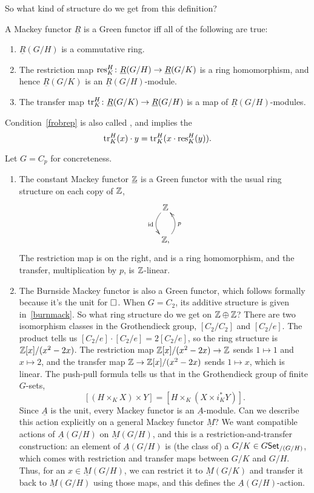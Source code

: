 So what kind of structure do we get from this definition?
\begin{prop}
A Mackey functor $\underline R$ is a Green functor iff all of the following are true:
\begin{enumerate}
	\item $\underline R(G/H)$ is a commutative ring.
	\item The restriction map $\operatorname{res}_K^H\colon \underline R(G/H)\to \underline R(G/K)$ is a ring homomorphism, and
	hence $\underline R(G/K)$ is an $\underline R(G/H)$-module.
	\item\label{frobrep} The transfer map $\operatorname{tr}_K^H\colon \underline R(G/K)\to \underline R(G/H)$ is a map of
	$\underline R(G/H)$-modules.
\end{enumerate}
\end{prop}
Condition~\eqref{frobrep} is also called , and implies the 
\[\operatorname{tr}_K^H(x)\cdot y = \operatorname{tr}_K^H(x\cdot\operatorname{res}_K^H(y)).\]
\begin{exm}
Let $G = C_p$ for concreteness.
\begin{enumerate}
	\item The constant Mackey functor $\underline{\mathbb Z}$ is a Green functor with the usual ring structure on each copy
	of $\mathbb Z$,
	\[\xymatrix{
		\Z\ar@/_0.4cm/[d]_\id\\
		\Z,\ar@/_0.4cm/[u]_p
	}\]
	The restriction map is on the right, and is a ring homomorphism, and the transfer, multiplication by $p$, is
	$\mathbb Z$-linear.
	\item The Burnside Mackey functor is also a Green functor, which follows formally because it's the unit for
	$\mathbin\square$. When $G = C_2$, its additive structure is given in~\eqref{burnmack}. So what ring structure do we
	get on $\mathbb Z\oplus\mathbb Z$? There are two isomorphism classes in the Grothendieck group, $[C_2/C_2]$ and $[C_2/e]$.
	The product tells us $[C_2/e]\cdot [C_2/e] = 2[C_2/e]$, so the ring structure is $\mathbb Z[x]/(x^2-2x)$. The
	restriction map $\mathbb Z[x]/(x^2-2x)\to\mathbb Z$ sends $1\mapsto 1$ and $x\mapsto 2$, and the transfer map
	$\mathbb Z\to\mathbb Z[x]/(x^2-2x)$ sends $1\mapsto x$, which is linear. The push-pull formula tells us that in the
	Grothendieck group of finite $G$-sets,
	\[[(H\times_K X)\times Y] = [H\times_K (X\times i_K^*Y)].\]
	Since $\underline A$ is the unit, every Mackey functor is an $\underline A$-module. Can we describe this action
	explicitly on a general Mackey functor $\underline M$? We want compatible actions of $\underline A(G/H)$ on
	$\underline M(G/H)$, and this is a restriction-and-transfer construction: an element of $\underline A(G/H)$ is
	(the class of) a $G/K\in G\mathsf{Set}_{/(G/H)}$, which comes with restriction and transfer maps between $G/K$ and
	$G/H$. Thus, for an $x\in\underline M(G/H)$, we can restrict it to $\underline M(G/K)$ and transfer it back to
	$\underline M(G/H)$ using those maps, and this defines the $\underline A(G/H)$-action.\qedhere
\end{enumerate}
\end{exm}
